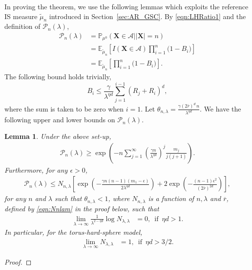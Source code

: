 \documentclass[11pt]{article}
\newcommand{\pp}{\mathbb{P}}
\newcommand{\rbdd}{\overline{r}}
\newcommand{\mbb}{\mathbb}
\newcommand{\lt}{\left}
\newcommand{\rt}{\right}
\newcommand{\wt}{\widetilde}
\newcommand{\state}{\mathbf{X}}
\newcommand{\pnon}{\mathcal{P}_n(\lambda)}
\newtheorem{lemma}{Lemma}
\begin{document}
\begin{appendices}
In proving the theorem, we use the following lemmas which exploits the reference IS measure  $\wt \mu_n$ introduced in Section~\ref{sec:AR_GSC}.
By \eqref{eqn:LHRatio1} and the definition of $\pnon$,
\begin{align}
\label{eqn:PnBi}
\pnon &= \pp_{\mu^0} \lt(\state \in \mathscr{A} \big| |\state | = n \rt)\nonumber\\
      &= {\mbb E}_{\wt \mu_n}\left[I\lt(\state \in \mathscr{A} \rt)\prod_{i=1}^{n}\Big(1 - B_{i}\Big)\right]\nonumber\\
      &= {\mbb E}_{\wt \mu_n}\left[\prod_{i=1}^{n}\Big(1 - B_{i}\Big)\right].
\end{align}
The following bound holds  trivially,
\begin{equation}
\label{eqn:bni-ran}
B_{i} \leq \frac{\gamma}{\lambda^{\eta d}}\sum_{j=1}^{i-1}\left(R_j + R_i\right)^d,
\end{equation}
where the sum is taken to be zero when $i = 1$.
Let $\theta_{n,\lambda}  = \frac{\gamma (2\rbdd)^d\, n}{\lambda^{\eta d}}$. We have the following upper and lower bounds on $\pnon$. 
\begin{lemma}
\label{lem:binomial}
Under the above set-up,
 \begin{align}
 \label{eqn:pnon_low}
  \pnon \geq \exp\lt( - n \sum_{j = 1}^\infty \lt(\frac{\gamma n}{\lambda^{\eta d}}\rt)^j \frac{m_j}{j(j+1)}\rt).
 \end{align}
Furthermore, for any $\epsilon > 0$,
\begin{align}
  \label{eqn:pnon_up}
  \pnon \leq N_{n,\lambda} \lt[ \exp\left( - \frac{\gamma n(n-1)(m_1 - \epsilon)}{2\lambda^{\eta d}} \right) + 2\exp\left( - \frac{(n-1)\epsilon^2}{(2\rbdd)^{2d}}\right)\rt],
 \end{align}
 for any $n$ and $\lambda$ such that $\theta_{n, \lambda} < 1$, where $N_{n, \lambda}$ is a function of $n, \lambda$ and $\rbdd$, defined by \eqref{eqn:Nnlam} in the proof below, such that  
\begin{align}
  \lim_{\lambda \rightarrow \infty }\frac{1}{\lambda^{2 -\eta d}} \log N_{\lambda, \lambda} &= 0,\, \text{ if }\, \eta d > 1.\label{eqn:Kr-term22}
 \end{align}
 In particular, for the torus-hard-sphere model,
 \begin{align}
  \lim_{\lambda \rightarrow \infty } N_{\lambda, \lambda} &= 1,\, \text{ if }\, \eta d > 3/2.\label{eqn:Kr-term2}
 \end{align}
\end{lemma}
\begin{proof}

\end{proof}
\end{appendices}
\end{document}
